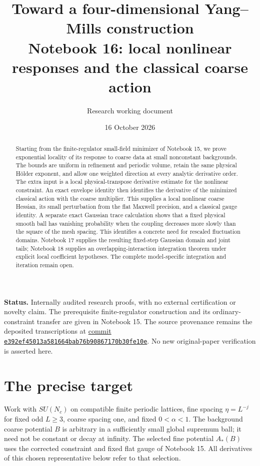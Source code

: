 \documentclass[11pt]{article}
\title{Toward a four-dimensional Yang--Mills construction\\
\large Notebook 16: local nonlinear responses and the classical coarse action}
\author{Research working document}
\date{16 October 2026}
\theoremstyle{remark}
\begin{document}
\maketitle
\begin{abstract}
Starting from the finite-regulator small-field minimizer of
Notebook 15, we prove exponential locality of its response to
coarse data at small nonconstant backgrounds. The bounds are
uniform in refinement and periodic volume, retain the same
physical H\"older exponent, and allow one weighted direction
at every analytic derivative order. The extra input is a local
physical-transpose derivative estimate for the nonlinear
constraint. An exact envelope identity then identifies the
derivative of the minimized classical action with the coarse
multiplier. This supplies a local nonlinear coarse Hessian,
its small perturbation from the flat Maxwell precision, and a
classical gauge identity. A separate exact Gaussian trace
calculation shows that a fixed physical smooth ball has vanishing
probability when the coupling decreases more slowly than the
square of the mesh spacing. This identifies a concrete need for
rescaled fluctuation domains. Notebook 17 supplies the resulting
fixed-step Gaussian domain and joint tails; Notebook 18 supplies
an overlapping-interaction integration theorem under explicit local
coefficient hypotheses. The complete model-specific integration
and iteration remain open.
\end{abstract}

\noindent\textbf{Status.}
Internally audited research proofs, with no external certification
or novelty claim. The prerequisite finite-regulator construction
and its ordinary-constraint transfer are given in Notebook 15.
The source provenance remains the deposited transcriptions at
\href{https://github.com/ethanwsussman/Yang--Mills-LLM-experiment/tree/e392ef45013a581664bab76b90867170b30fe10e}{commit
\texttt{e392ef4501\allowbreak 3a581664ba\allowbreak b76b908671\allowbreak 70b30fe10e}}.
No new original-paper verification is asserted here.

\section{The precise target}
\label{nr16-target}

Work with $SU(N_c)$ on compatible finite periodic lattices,
fine spacing $\eta=L^{-j}$ for fixed odd $L\ge3$, coarse
spacing one, and fixed $0<\alpha<1$. The background coarse
potential $B$ is arbitrary in a sufficiently small global
supremum ball; it need not be constant or decay at infinity.
The selected fine potential $A_*(B)$ uses the corrected
constraint and fixed flat gauge of Notebook 15. All derivatives
of this chosen representative below refer to that selection.
\end{document}
